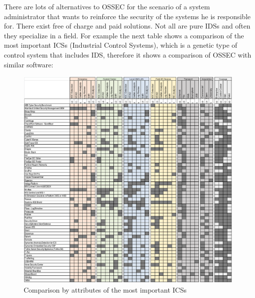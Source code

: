 \linej
There are lots of alternatives to OSSEC for the scenario of a system administrator that wants to reinforce the security of the systems he is responsible for. There exist free of charge and paid solutions. Not all are pure IDSs and often they specialize in a field. For example the next table shows a comparison of the most important ICSs (Industrial Control Systems), which is a genetic type of control system that includes IDS, therefore it shows a comparison of OSSEC with similar software:
\begin{figure}[H]
  \centering
	\includegraphics[width=\textwidth]{figuras/comparison_ics.png}
	\caption{Comparison by attributes of the most important ICSs\cite{comparison_ics}}
\end{figure}


